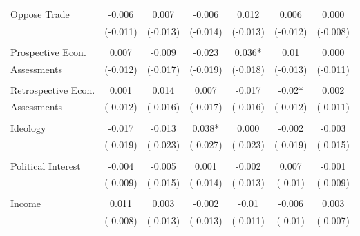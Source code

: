 \documentclass[12pt]{article}
\begin{document}
\begin{appendices}
\begin{refsection}
\begin{table}[!ht]
\begin{adjustbox}{width=\textwidth,center}
\begin{tabular}{@{\extracolsep{5pt}}lcccccc}
Oppose Trade         & -0.006             & 0.007    & -0.006    & 0.012             & 0.006    & 0.000         \\
                     & (-0.011)           & (-0.013) & (-0.014)  & (-0.013)          & (-0.012) & (-0.008)      \\
                     &                    &          &           &                   &          &               \\
Prospective Econ.    & 0.007              & -0.009   & -0.023    & 0.036*            & 0.01     & 0.000         \\
Assessments          & (-0.012)           & (-0.017) & (-0.019)  & (-0.018)          & (-0.013) & (-0.011)      \\
                     &                    &          &           &                   &          &               \\
Retrospective Econ.  & 0.001              & 0.014    & 0.007     & -0.017            & -0.02*   & 0.002         \\
Assessments          & (-0.012)           & (-0.016) & (-0.017)  & (-0.016)          & (-0.012) & (-0.011)      \\
                     &                    &          &           &                   &          &               \\
Ideology             & -0.017             & -0.013   & 0.038*    & 0.000             & -0.002   & -0.003        \\
                     & (-0.019)           & (-0.023) & (-0.027)  & (-0.023)          & (-0.019) & (-0.015)      \\
                     &                    &          &           &                   &          &               \\
Political Interest   & -0.004             & -0.005   & 0.001     & -0.002            & 0.007    & -0.001        \\
                     & (-0.009)           & (-0.015) & (-0.014)  & (-0.013)          & (-0.01)  & (-0.009)      \\
                     &                    &          &           &                   &          &               \\
Income               & 0.011              & 0.003    & -0.002    & -0.01             & -0.006   & 0.003         \\
                     & (-0.008)           & (-0.013) & (-0.013)  & (-0.011)          & (-0.01)  & (-0.007)      \\

\end{tabular}
\end{adjustbox}
\end{table}
\end{refsection}
\end{appendices}
\end{document}

